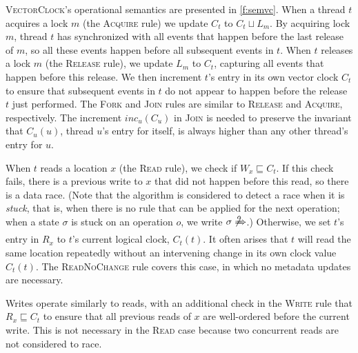 \documentclass[preprint, 10pt]{sigplanconf}
\newcommand{\Tid}{t}
\newcommand{\TidU}{u}
\newcommand{\Address}{x}
\newcommand{\Lock}{m}
\newcommand{\VCFont}{}
\newcommand{\ThreadVC}[1]{\VCFont{C}_{#1}}
\newcommand{\LockVC}[1]{\VCFont{L}_{#1}}
\newcommand{\ReadVC}[1]{\VCFont{R}_{#1}}
\newcommand{\WriteVC}[1]{\VCFont{W}_{#1}}
\newcommand{\VCalg}{\textsc{VectorClock}\xspace}
\newcommand{\Rule}[1]{\textsc{#1}}
\newcommand{\VCMax}{\sqcup}
\newcommand{\VCCompare}{\sqsubseteq}
\begin{document}
\VCalg's operational semantics are presented in \autoref{f:semvc}. When a thread $\Tid$ acquires a lock $\Lock$ (the \Rule{Acquire} rule) we update $\ThreadVC{\Tid}$ to $\ThreadVC{\Tid} \VCMax \LockVC{\Lock}$.  By acquiring lock $\Lock$, thread $\Tid$ has synchronized with all events that happen before the last release of $\Lock$, so all these events happen before all subsequent events in $\Tid$.  When $\Tid$ releases a lock $\Lock$ (the \Rule{Release} rule), we update $\LockVC{\Lock}$ to $\ThreadVC{\Tid}$, capturing all events that happen before this release.  We then increment $\Tid$'s entry in its own vector clock $\ThreadVC{\Tid}$ to ensure that subsequent events in $\Tid$ do not appear to happen before the release $\Tid$ just performed.  The \Rule{Fork} and \Rule{Join} rules are similar to \Rule{Release} and \Rule{Acquire}, respectively. The increment $\mathit{inc}_u(C_u)$ in \Rule{Join} is needed to preserve the invariant that $\ThreadVC{\TidU}(u)$, thread $\TidU$'s entry for itself, is always higher than any other thread's entry for $\TidU$.

When $\Tid$ reads a location $\Address$ (the \Rule{Read} rule), we check if $\WriteVC{\Address} \VCCompare \ThreadVC{\Tid}$.  If this check fails, there is a previous write to $\Address$ that did not happen before this read, so there is a data race. (Note that the algorithm is considered to detect a race when it is \emph{stuck}, that is, when there is no rule that can be applied for the next operation; when a state $\sigma$ is stuck on an operation $o$, we write $\sigma \not\xRightarrow{o}$.) Otherwise, we set $\Tid$'s entry in $\ReadVC{\Address}$ to $\Tid$'s current logical clock, $\ThreadVC{\Tid}(\Tid)$.  It often arises that $\Tid$ will read the same location repeatedly without an intervening change in its own clock value $\ThreadVC{\Tid}(\Tid)$. The \Rule{ReadNoChange} rule covers this case, in which no metadata updates are necessary.

Writes operate similarly to reads, with an additional check in the \Rule{Write} rule that $\ReadVC{\Address} \VCCompare \ThreadVC{\Tid}$ to ensure that all previous reads of $\Address$ are well-ordered before the current write. This is not necessary in the \Rule{Read} case because two concurrent reads are not considered to race.

\end{document}
